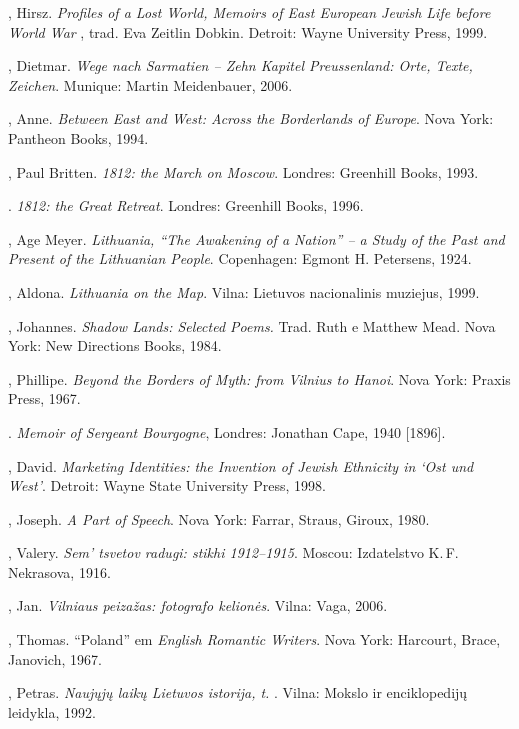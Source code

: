 \begin{bibliohedra}
 , Hirsz. \textit{Profiles of a Lost World, Memoirs of East
  European Jewish Life before World War }, trad. Eva Zeitlin Dobkin. Detroit: Wayne University
  Press, 1999.

  , Dietmar. \textit{Wege nach Sarmatien -- Zehn Kapitel
  Preussenland: Orte, Texte, Zeichen}. Munique: Martin Meidenbauer,
  2006.

  , Anne. \textit{Between East and West: Across the Borderlands
  of Europe}. Nova York: Pantheon Books, 1994.

  , Paul Britten. \textit{1812: the March on Moscow}. Londres:
  Greenhill Books, 1993.

  \titidem. \textit{1812: the Great Retreat}. Londres:
  Greenhill Books, 1996.

  , Age Meyer. \textit{Lithuania, ``The Awakening of a Nation''
  -- a Study of the Past and Present of the Lithuanian People}.
  Copenhagen: Egmont H. Petersens, 1924.

  , Aldona. \textit{Lithuania on the Map}. Vilna:
  Lietuvos nacionalinis muziejus, 1999.

  , Johannes. \textit{Shadow Lands: Selected Poems.} Trad. Ruth e
  Matthew Mead. Nova York: New Directions Books, 1984.

  , Phillipe. \textit{Beyond the Borders of Myth: from Vilnius to
  Hanoi}. Nova York: Praxis Press, 1967.

  . \textit{Memoir of Sergeant Bourgogne}, Londres: Jonathan Cape,
  1940 {[}1896{]}.

  , David. \textit{Marketing Identities: the Invention of Jewish
  Ethnicity in `Ost und West'}. Detroit: Wayne State University Press,
  1998.

  , Joseph. \textit{A Part of Speech}. Nova York: Farrar, Straus,
  Giroux, 1980.

  , Valery. \textit{Sem' tsvetov radugi: stikhi 1912--1915}. Moscou:
  Izdatelstvo K.\,F. Nekrasova, 1916.

  , Jan. \textit{Vilniaus peizažas: fotografo kelionės}. Vilna:
  Vaga, 2006.

  , Thomas. ``Poland'' em \textit{English Romantic Writers}. Nova York: Harcourt, Brace, Janovich, 1967.

  , Petras. \textit{Naujųjų laikų Lietuvos istorija, t. }.
  Vilna: Mokslo ir enciklopedijų leidykla, 1992.


\end{bibliohedra}
